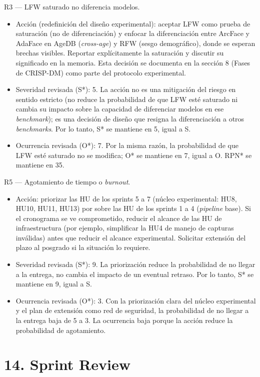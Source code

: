 \documentclass[
  11pt, %
]{charter}
\begin{document}
R3 --- LFW saturado no diferencia modelos.

\begin{itemize}
\item Acción (redefinición del diseño experimental): aceptar LFW como prueba de saturación (no de diferenciación) y enfocar la diferenciación entre ArcFace y AdaFace en AgeDB (\textit{cross-age}) y RFW (sesgo demográfico), donde se esperan brechas visibles. Reportar explícitamente la saturación y discutir su significado en la memoria. Esta decisión se documenta en la sección 8 (Fases de CRISP-DM) como parte del protocolo experimental.
\item Severidad revisada (S*): 5. La acción no es una mitigación del riesgo en sentido estricto (no reduce la probabilidad de que LFW esté saturado ni cambia su impacto sobre la capacidad de diferenciar modelos en ese \textit{benchmark}); es una decisión de diseño que resigna la diferenciación a otros \textit{benchmarks}. Por lo tanto, S* se mantiene en 5, igual a S.
\item Ocurrencia revisada (O*): 7. Por la misma razón, la probabilidad de que LFW esté saturado no se modifica; O* se mantiene en 7, igual a O. RPN* se mantiene en 35.
\end{itemize}

R5 --- Agotamiento de tiempo o \textit{burnout}.

\begin{itemize}
\item Acción: priorizar las HU de los sprints 5 a 7 (núcleo experimental: HU8, HU10, HU11, HU13) por sobre las HU de los sprints 1 a 4 (\textit{pipeline} base). Si el cronograma se ve comprometido, reducir el alcance de las HU de infraestructura (por ejemplo, simplificar la HU4 de manejo de capturas inválidas) antes que reducir el alcance experimental. Solicitar extensión del plazo al posgrado si la situación lo requiere.
\item Severidad revisada (S*): 9. La priorización reduce la probabilidad de no llegar a la entrega, no cambia el impacto de un eventual retraso. Por lo tanto, S* se mantiene en 9, igual a S.
\item Ocurrencia revisada (O*): 3. Con la priorización clara del núcleo experimental y el plan de extensión como red de seguridad, la probabilidad de no llegar a la entrega baja de 5 a 3. La ocurrencia baja porque la acción reduce la probabilidad de agotamiento.
\end{itemize}

\section{14. Sprint Review}
\label{sec:sprint_review}
\end{document}
